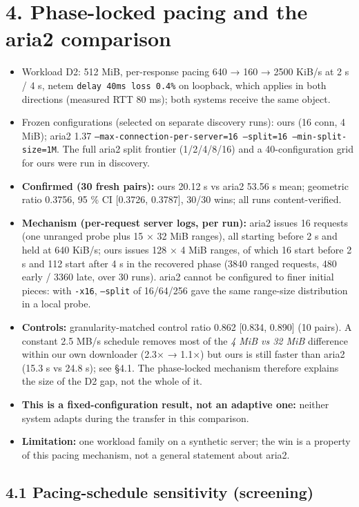 \documentclass{ieeeaccess}
\begin{document}
\section*{4. Phase-locked pacing and the aria2 comparison}

\begin{itemize}
\item Workload D2: 512 MiB, per-response pacing 640 → 160 → 2500 KiB/s at 2 s / 4 s, netem \texttt{delay 40ms loss 0.4\%} on loopback, which applies in both directions (measured RTT 80 ms); both systems receive the same object.
\item Frozen configurations (selected on separate discovery runs): ours (16 conn, 4 MiB); aria2 1.37 \texttt{--max-connection-per-server=16 --split=16 --min-split-size=1M}. The full aria2 split frontier (1/2/4/8/16) and a 40-configuration grid for ours were run in discovery.
\item \textbf{Confirmed (30 fresh pairs):} ours 20.12 s vs aria2 53.56 s mean; geometric ratio 0.3756, 95 \% CI [0.3726, 0.3787], 30/30 wins; all runs content-verified.
\item \textbf{Mechanism (per-request server logs, per run):} aria2 issues 16 requests (one unranged probe plus 15 × 32 MiB ranges), all starting before 2 s and held at 640 KiB/s; ours issues 128 × 4 MiB ranges, of which 16 start before 2 s and 112 start after 4 s in the recovered phase (3840 ranged requests, 480 early / 3360 late, over 30 runs). aria2 cannot be configured to finer initial pieces: with \texttt{-x16}, \texttt{--split} of 16/64/256 gave the same range-size distribution in a local probe.
\item \textbf{Controls:} granularity-matched control ratio 0.862 [0.834, 0.890] (10 pairs). A constant 2.5 MB/s schedule removes most of the \emph{4 MiB vs 32 MiB} difference within our own downloader (2.3× → 1.1×) but ours is still faster than aria2 (15.3 s vs 24.8 s); see §4.1. The phase-locked mechanism therefore explains the size of the D2 gap, not the whole of it.
\item \textbf{This is a fixed-configuration result, not an adaptive one:} neither system adapts during the transfer in this comparison.
\item \textbf{Limitation:} one workload family on a synthetic server; the win is a property of this pacing mechanism, not a general statement about aria2.
\end{itemize}

\subsection*{4.1 Pacing-schedule sensitivity (screening)}
\end{document}
